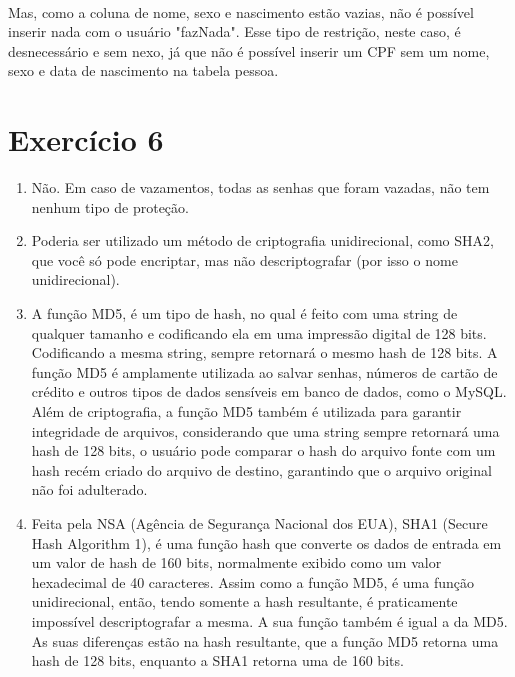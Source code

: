 \documentclass{article}
\begin{document}
\paragraph{} Mas, como a coluna de nome, sexo e nascimento estão vazias, não é possível inserir nada com o usuário "fazNada". Esse tipo de restrição, neste caso, é desnecessário e sem nexo, já que não é possível inserir um CPF sem um nome, sexo e data de nascimento na tabela pessoa. 

\section*{Exercício 6}

\begin{enumerate}[label=\alph*)]
    \item Não. Em caso de vazamentos, todas as senhas que foram vazadas, não tem nenhum tipo de proteção.
    
    \item Poderia ser utilizado um método de criptografia unidirecional, como SHA2, que você só pode encriptar, mas não descriptografar (por isso o nome unidirecional).
    
    \item A função MD5, é um tipo de hash, no qual é feito com uma string de qualquer tamanho e codificando ela em uma impressão digital de 128 bits. Codificando a mesma string, sempre retornará o mesmo hash de 128 bits. A função MD5 é amplamente utilizada ao salvar senhas, números de cartão de crédito e outros tipos de dados sensíveis em banco de dados, como o MySQL. Além de criptografia, a função MD5 também é utilizada para garantir integridade de arquivos, considerando que uma string sempre retornará uma hash de 128 bits, o usuário pode comparar o hash do arquivo fonte com um hash recém criado do arquivo de destino, garantindo que o arquivo original não foi adulterado.
    
    \item Feita pela NSA (Agência de Segurança Nacional dos EUA), SHA1 (Secure Hash Algorithm 1), é uma função hash que converte os dados de entrada em um valor de hash de 160 bits, normalmente exibido como um valor hexadecimal de 40 caracteres. Assim como a função MD5, é uma função unidirecional, então, tendo somente a hash resultante, é praticamente impossível descriptografar a mesma. A sua função também é igual a da MD5. As suas diferenças estão na hash resultante, que a função MD5 retorna uma hash de 128 bits, enquanto a SHA1 retorna uma de 160 bits.
    

\end{enumerate}
\end{document}
